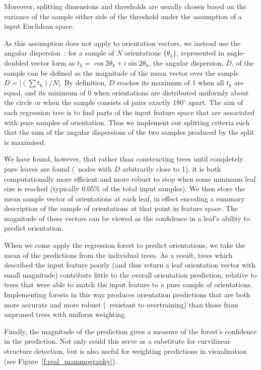 \documentclass[10pt,twocolumn,letterpaper]{article}
\newcommand{\fref}[1]{Figure~\ref{#1}}
\def\dtcwt{DT-$\mathbb{C}$WT}
\newcommand{\comment}[1]{}
\begin{document}
Moreover, splitting dimensions and thresholds are usually chosen based on the variance of the sample either side of the threshold under the assumption of a input Euclidean space.
\comment{One reviewer complained about this previous sentence}
As this assumption does not apply to orientation vectors, we instead use the angular dispersion~\cite{Mardia_Jupp_00}: for a sample of $N$ orientations $\{\theta_k\}$, represented in angle-doubled vector form as $t_k = \cos 2\theta_k + i\sin 2\theta_k$, the angular dispersion, $D$, of the sample can be defined as the magnitude of the mean vector over the sample \ie~$D = |(\sum{t_k})/N|$.
%
%
By definition, $D$ reaches its maximum of 1 when all $t_k$ are equal, and its minimum of 0 when orientations are distributed uniformly about the circle or when the sample consists of pairs exactly $180^\circ$ apart. The aim of each regression tree is to find parts of the input feature space that are associated with pure samples of orientation. Thus we implement our splitting criteria such that the sum of the angular dispersions of the two samples produced by the split is maximised.

We have found, however, that rather than constructing trees until completely pure leaves are found (\ie~nodes with $D$ arbitrarily close to 1), it is both computationally more efficient and more robust to stop when some minimum leaf size is reached (typically 0.05\% of the total input samples). We then store the mean sample vector of orientations at each leaf, in effect encoding a summary description of the sample of orientations at that point in feature space. The magnitude of these vectors can be viewed as the confidence in a leaf's ability to predict orientation.

When we come apply the regression forest to predict orientations, we take the mean of the predictions from the individual trees. As a result, trees which described the input feature poorly (and thus return a leaf orientation vector with small magnitude) contribute little to the overall orientation prediction, relative to trees that were able to match the input feature to a pure sample of orientations. Implementing forests in this way produces orientation predictions that are both more accurate and more robust (\ie~resistant to overtraining) than those from unpruned trees with uniform weighting.

Finally, the magnitude of the prediction gives a measure of the forest's confidence in the prediction. Not only could this serve as a substitute for curvilinear structure detection, but is also useful for weighting predictions in visualization (see \fref{f:real_mammography}).
\end{document}
